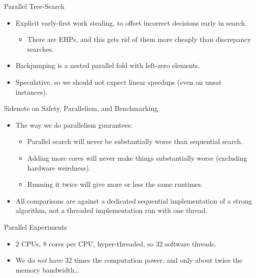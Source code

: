 \documentclass{beamer}
\begin{document}
\begin{frame}{Parallel Tree-Search}
     {
        \begin{itemize}
            \item Explicit \textcolor{uofgrose}{early-first work stealing}, to offset incorrect
                decisions early in search.
                \begin{itemize}
                    \item There are EHPs, and this gets rid of them more cheaply than discrepancy
                        searches.
                \end{itemize}
            \item Backjumping is a nested parallel fold with left-zero elements.
            \item Speculative, so we should \textcolor{uofgrose}{not expect linear speedups} (even
                on unsat instances).
        \end{itemize}
    }
\end{frame}

\begin{frame}{Sidenote on Safety, Parallelism, and Benchmarking}
    \begin{itemize}
        \item The way we do parallelism guarantees:
            \begin{itemize}
                \item Parallel search will \textcolor{uofgrose}{never be substantially worse} than
                    sequential search.
                \item Adding more cores will never make things substantially worse (excluding
                    hardware weirdness).
                \item Running it twice will give more or less the same runtimes.
            \end{itemize}
        \item All comparisons are against a dedicated sequential implementation of a strong
            algorithm, not a threaded implementation run with one thread.
    \end{itemize}
\end{frame}

\begin{frame}{Parallel Experiments}
    \begin{itemize}
        \item 2 CPUs, 8 cores per CPU, hyper-threaded, so 32 software threads.
        \item We do \emph{not} have 32 times the computation power, and only about twice the memory
            bandwidth\ldots
    \end{itemize}
\end{frame}
\end{document}
